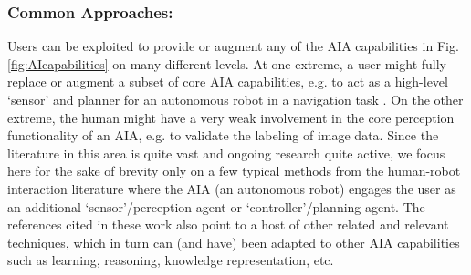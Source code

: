 \subsubsection{Common Approaches:} 
Users can be exploited to provide or augment any of the AIA capabilities in Fig. \ref{fig:AIcapabilities} on many different levels. 
At one extreme, a user might fully replace or augment a subset of core AIA capabilities, e.g. to act as a high-level `sensor' and planner for an autonomous robot in a navigation task \cite{Kaupp2008-yr}.  
On the other extreme, the human might have a very weak involvement in the core perception functionality of an AIA, e.g. to validate the labeling of image data. %
%
Since the literature in this area is quite vast and ongoing research quite active, we focus here for the sake of brevity only on a few typical methods from the human-robot interaction literature where the AIA (an autonomous robot) engages the user as an additional `sensor'/perception agent or `controller'/planning agent. The references cited in these work also point to a host of other related and relevant techniques, which in turn can (and have) been adapted to other AIA capabilities such as learning, reasoning, knowledge representation, etc.

